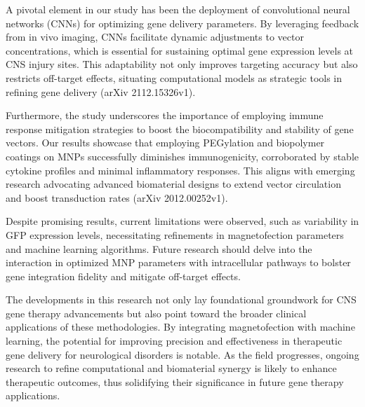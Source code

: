 \documentclass{article}
\begin{document}
A pivotal element in our study has been the deployment of convolutional neural networks (CNNs) for optimizing gene delivery parameters. By leveraging feedback from in vivo imaging, CNNs facilitate dynamic adjustments to vector concentrations, which is essential for sustaining optimal gene expression levels at CNS injury sites. This adaptability not only improves targeting accuracy but also restricts off-target effects, situating computational models as strategic tools in refining gene delivery (arXiv 2112.15326v1).

Furthermore, the study underscores the importance of employing immune response mitigation strategies to boost the biocompatibility and stability of gene vectors. Our results showcase that employing PEGylation and biopolymer coatings on MNPs successfully diminishes immunogenicity, corroborated by stable cytokine profiles and minimal inflammatory responses. This aligns with emerging research advocating advanced biomaterial designs to extend vector circulation and boost transduction rates (arXiv 2012.00252v1).

Despite promising results, current limitations were observed, such as variability in GFP expression levels, necessitating refinements in magnetofection parameters and machine learning algorithms. Future research should delve into the interaction in optimized MNP parameters with intracellular pathways to bolster gene integration fidelity and mitigate off-target effects.

The developments in this research not only lay foundational groundwork for CNS gene therapy advancements but also point toward the broader clinical applications of these methodologies. By integrating magnetofection with machine learning, the potential for improving precision and effectiveness in therapeutic gene delivery for neurological disorders is notable. As the field progresses, ongoing research to refine computational and biomaterial synergy is likely to enhance therapeutic outcomes, thus solidifying their significance in future gene therapy applications.
\end{document}
